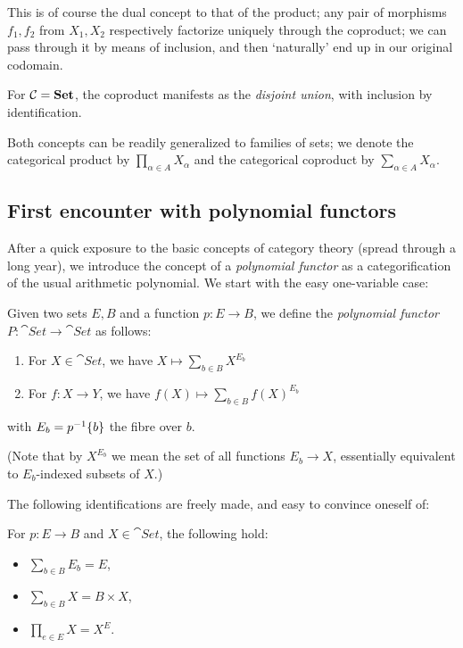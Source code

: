 This is of course the dual concept to that of the product; any pair of morphisms $f_1,f_2$ from $X_1,X_2$ respectively factorize uniquely through the coproduct; we can pass through it by means of inclusion, and then `naturally' end up in our original codomain.

For $\mathcal{C}=\mathbf{Set}$, the coproduct manifests as the \emph{disjoint union}, with inclusion by identification.

Both concepts can be readily generalized to families of sets; we denote the categorical product by $\prod_{\alpha\in A} X_\alpha$ and the categorical coproduct by $\sum_{\alpha\in A} X_\alpha$.



\subsection{First encounter with polynomial functors}

After a quick exposure to the basic concepts of category theory (spread through a long year), we introduce the concept of a \emph{polynomial functor} as a categorification of the usual arithmetic polynomial. We start with the easy one-variable case:

\begin{definition}
	Given two sets $E,B$ and a function $p:E\to B$, we define the \emph{polynomial functor} $P:\cat{Set}\to\cat{Set}$ as follows:
    \begin{enumerate}
    \item For $X\in\cat{Set}$, we have $X \mapsto \sum_{b\in B} X^{E_b}$
    \item For $f:X\to Y$, we have $f(X) \mapsto \sum_{b\in B} f(X)^{E_b}$
    \end{enumerate}

    with $E_b=p^{-1}\{b\}$ the fibre over $b$.
\end{definition}

(Note that by $X^{E_b}$ we mean the set of all functions $E_b\to X$, essentially equivalent to $E_b$-indexed subsets of $X$.)

The following identifications are freely made, and easy to convince oneself of:
\begin{lemma}
	For $p:E\to B$ and $X\in\cat{Set}$, the following hold:
	\begin{itemize}
		\item $\sum_{b\in B} E_{b} = E$,
		\item $\sum_{b\in B} X = B\times X$,
		\item $\prod_{e\in E} X = X^E$.
		\end{itemize}
\end{lemma}


